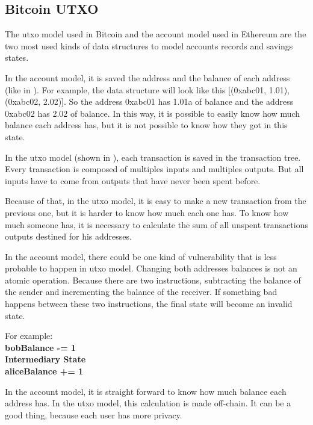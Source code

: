 \subsection{Bitcoin UTXO}


The \gls{utxo} model used in Bitcoin and the account model used in Ethereum are the two most used kinds
of data structures to model accounts records and savings states.

In the account model, it is saved the address and the balance of each address
(like in ).
For example, the data structure will look like this [(0xabc01, 1.01), (0xabc02, 2.02)].
So the address 0xabc01 has 1.01a of balance and the address 0xabc02 has 2.02 of balance.
In this way, it is possible to easily know how much balance each address has,
but it is not possible to know how they got in this state.


In the \gls{utxo} model (shown in ), each transaction is saved in the transaction tree.
Every transaction is composed of multiples inputs and multiples outputs.
But all inputs have to come from outputs that have never been spent before.

Because of that, in the \gls{utxo} model, it is easy to make a new transaction from the previous one,
but it is harder to know how much each one has.
To know how much someone has, it is necessary to calculate the sum of all unspent transactions outputs
destined for his addresses.

In the account model, there could be one kind of vulnerability
that is less probable to happen in \gls{utxo} model.
Changing both addresses balances is not an atomic operation.
Because there are two instructions, subtracting the balance of the sender
and incrementing the balance of the receiver.
If something bad happens between these two instructions, the final state
will become an invalid state.

For example: \\
\textbf{
bobBalance -= 1 \\
Intermediary State \\
aliceBalance += 1
}

In the account model, it is straight forward to know how much balance each address has.
In the \gls{utxo} model, this calculation is made off-chain. It can be a good thing,
because each user has more privacy.
